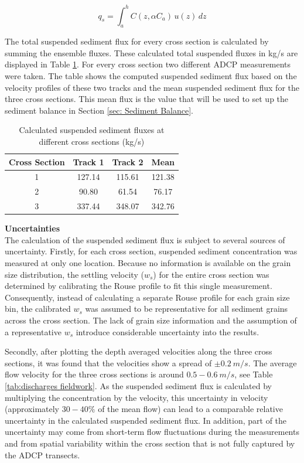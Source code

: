 \begin{equation}
    q_{s} = \int_{a}^{h} C(z, \alpha C_a) \, u(z) \, dz
    \label{eq: sediment flux formula}
\end{equation}

The total suspended sediment flux for every cross section is calculated by summing the ensemble fluxes. These calculated total suspended fluxes in kg/s are displayed in Table \ref{tab:Calculated suspended sediment flux}. For every cross section two different ADCP measurements were taken. The table shows the computed suspended sediment flux based on the velocity profiles of these two tracks and the mean suspended sediment flux for the three cross sections. This mean flux is the value that will be used to set up the sediment balance in Section \ref{sec: Sediment Balance}. 
 
\begin{table}[H]
    \centering
    \caption{Calculated suspended sediment fluxes at different cross sections (kg/s)}
    \label{tab:Calculated suspended sediment flux}
    \setlength{\tabcolsep}{8pt}
    \begin{tabular}{c c c c}
        \hline
        Cross Section & Track 1 & Track 2 & Mean\\
        \hline
        1 & 127.14 & 115.61 & 121.38\\
        2 & 90.80  & 61.54  & 76.17\\
        3 & 337.44 & 348.07 & 342.76\\
        \hline
    \end{tabular}
\end{table}

\textbf{Uncertainties} \\
The calculation of the suspended sediment flux is subject to several sources of uncertainty. Firstly, for each cross section, suspended sediment concentration was measured at only one location. Because no information is available on the grain size distribution, the settling velocity ($w_s$) for the entire cross section was determined by calibrating the Rouse profile to fit this single measurement. Consequently, instead of calculating a separate Rouse profile for each grain size bin, the calibrated $w_s$ was assumed to be representative for all sediment grains across the cross section. The lack of grain size information and the assumption of a representative $w_s$ introduce considerable uncertainty into the results.

Secondly, after plotting the depth averaged velocities along the three cross sections, it was found that the velocities show a spread of $\pm0.2~m/s$. The average flow velocity for the three cross sections is around $0.5-0.6~m/s$, see Table \ref{tab:discharges fieldwork}. As the suspended sediment flux is calculated by multiplying the concentration by the velocity, this uncertainty in velocity (approximately $30-40\%$ of the mean flow) can lead to a comparable relative uncertainty in the calculated suspended sediment flux. In addition, part of the uncertainty may come from short-term flow fluctuations during the measurements and from spatial variability within the cross section that is not fully captured by the ADCP transects.

